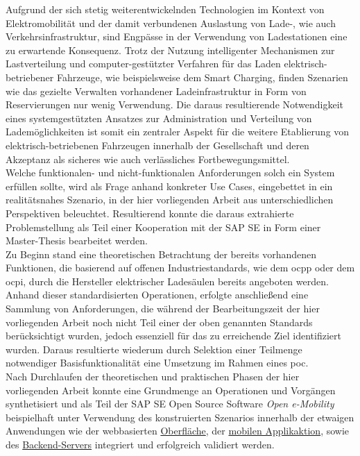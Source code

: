 
\Abstract
Aufgrund der sich stetig weiterentwickelnden Technologien im Kontext von Elektromobilit\"at und der damit verbundenen Auslastung von Lade-, wie auch Verkehrsinfrastruktur, sind Engp\"asse in der Verwendung von Ladestationen eine zu erwartende Konsequenz. 
Trotz der Nutzung intelligenter Mechanismen zur Lastverteilung und computer-gest\"utzter Verfahren f\"ur das Laden elektrisch-betriebener Fahrzeuge, wie beispielsweise dem Smart Charging, finden Szenarien wie das gezielte Verwalten vorhandener Ladeinfrastruktur in Form von Reservierungen nur wenig Verwendung.
Die daraus resultierende Notwendigkeit eines systemgest\"utzten Ansatzes zur Administration und Verteilung von Ladem\"oglichkeiten ist somit ein zentraler Aspekt f\"ur die weitere Etablierung von elektrisch-betriebenen Fahrzeugen innerhalb der Gesellschaft und deren Akzeptanz als sicheres wie auch verl\"assliches Fortbewegungsmittel.\\
Welche funktionalen- und nicht-funktionalen Anforderungen solch ein System erf\"ullen sollte, wird als Frage anhand konkreter Use Cases, eingebettet in ein realitätsnahes Szenario, in der hier vorliegenden Arbeit aus unterschiedlichen Perspektiven beleuchtet.
Resultierend konnte die daraus extrahierte Problemstellung als Teil einer Kooperation mit der SAP SE in Form einer Master-Thesis bearbeitet werden.\\
Zu Beginn stand eine theoretischen Betrachtung der bereits vorhandenen Funktionen, die basierend auf offenen Industriestandards, wie dem \acrfull{ocpp} oder dem \acrfull{ocpi}, durch die Hersteller elektrischer Lades\"aulen bereits angeboten werden.
Anhand dieser standardisierten Operationen, erfolgte anschließend eine Sammlung von Anforderungen, die w\"ahrend der Bearbeitungszeit der hier vorliegenden Arbeit noch nicht Teil einer der oben genannten Standards ber\"ucksichtigt wurden, jedoch essenziell f\"ur das zu erreichende Ziel identifiziert wurden.
Daraus resultierte wiederum durch Selektion einer Teilmenge notwendiger Basisfunktionalit\"at eine Umsetzung im Rahmen eines \acrshort{poc}.\\
Nach Durchlaufen der theoretischen und praktischen Phasen der hier vorliegenden Arbeit konnte eine Grundmenge an Operationen und Vorg\"angen synthetisiert und als Teil der SAP SE Open Source Software \textit{Open e-Mobility} beispielhaft unter Verwendung des konstruierten Szenarios innerhalb der etwaigen Anwendungen wie der webbasierten \href{https://github.com/JulianHBuecher/ev-dashboard/tree/reservation-process}{Oberfl\"ache}, der \href{https://github.com/JulianHBuecher/ev-mobile/tree/reservation-process}{mobilen Applikaktion}, sowie des \href{https://github.com/JulianHBuecher/ev-server/tree/reservation-process}{Backend-Servers} integriert und erfolgreich validiert werden.
